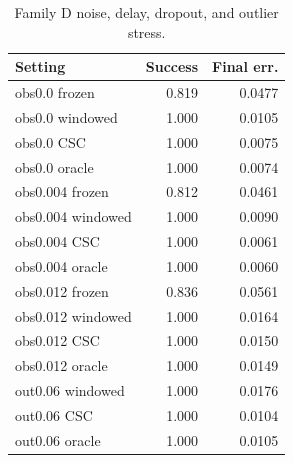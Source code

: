 \begin{table}[t]
\caption{Family D noise, delay, dropout, and outlier stress.}
\label{tab:noise}
\centering
\begin{tabular}{lrr}
\toprule
Setting & Success & Final err. \\
\midrule
obs0.0 frozen & 0.819 & 0.0477 \\
obs0.0 windowed & 1.000 & 0.0105 \\
obs0.0 CSC & 1.000 & 0.0075 \\
obs0.0 oracle & 1.000 & 0.0074 \\
obs0.004 frozen & 0.812 & 0.0461 \\
obs0.004 windowed & 1.000 & 0.0090 \\
obs0.004 CSC & 1.000 & 0.0061 \\
obs0.004 oracle & 1.000 & 0.0060 \\
obs0.012 frozen & 0.836 & 0.0561 \\
obs0.012 windowed & 1.000 & 0.0164 \\
obs0.012 CSC & 1.000 & 0.0150 \\
obs0.012 oracle & 1.000 & 0.0149 \\
out0.06 windowed & 1.000 & 0.0176 \\
out0.06 CSC & 1.000 & 0.0104 \\
out0.06 oracle & 1.000 & 0.0105 \\
\bottomrule
\end{tabular}
\end{table}
